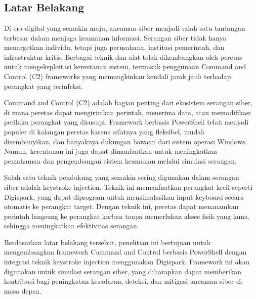 \chapter{\babSatu}



\section{Latar Belakang}

Di era digital yang semakin maju, ancaman siber menjadi salah satu tantangan terbesar dalam menjaga keamanan informasi\citep{gade2016cyberattacks}. Serangan siber tidak hanya menargetkan individu, tetapi juga perusahaan, institusi pemerintah, dan infrastruktur kritis. Berbagai teknik dan alat telah dikembangkan oleh peretas untuk mengeksploitasi kerentanan sistem, termasuk penggunaan Command and Control (C2) frameworks yang memungkinkan kendali jarak jauh terhadap perangkat yang terinfeksi.

Command and Control (C2) adalah bagian penting dari ekosistem serangan siber, di mana peretas dapat mengirimkan perintah, menerima data, atau memodifikasi perilaku perangkat yang disusupi\citep{hutchins2011killchain}. Framework berbasis PowerShell telah menjadi populer di kalangan peretas karena sifatnya yang fleksibel, mudah disembunyikan, dan banyaknya dukungan bawaan dari sistem operasi Windows\citep{powershell_c2}. Namun, kerentanan ini juga dapat dimanfaatkan untuk meningkatkan pemahaman dan pengembangan sistem keamanan melalui simulasi serangan.

Salah satu teknik pendukung yang semakin sering digunakan dalam serangan siber adalah keystroke injection\citep{usb_attack_digispark}. Teknik ini memanfaatkan perangkat kecil seperti Digispark, yang dapat diprogram untuk mensimulasikan input keyboard secara otomatis ke perangkat target. Dengan teknik ini, peretas dapat menanamkan perintah langsung ke perangkat korban tanpa memerlukan akses fisik yang lama, sehingga meningkatkan efektivitas serangan.

Berdasarkan latar belakang tersebut, penelitian ini bertujuan untuk mengembangkan framework Command and Control berbasis PowerShell dengan integrasi teknik keystroke injection menggunakan Digispark. Framework ini akan digunakan untuk simulasi serangan siber, yang diharapkan dapat memberikan kontribusi bagi peningkatan kesadaran, deteksi, dan mitigasi ancaman siber di masa depan\citep{nist_framework}.



